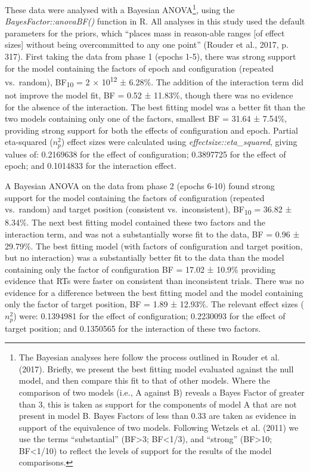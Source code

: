 \documentclass[
  man,
  floatsintext,
  longtable,
  nolmodern,
  notxfonts,
  notimes,
  colorlinks=true,linkcolor=blue,citecolor=blue,urlcolor=blue]{apa7}
\begin{document}
These data were analysed with a Bayesian ANOVA\footnote{The Bayesian
  analyses here follow the process outlined in Rouder et al. (2017).
  Briefly, we present the best fitting model evaluated against the null
  model, and then compare this fit to that of other models. Where the
  comparison of two models (i.e., A against B) reveals a Bayes Factor of
  greater than 3, this is taken as support for the components of model A
  that are not present in model B. Bayes Factors of less than 0.33 are
  taken as evidence in support of the equivalence of two models.
  Following Wetzels et al. (2011) we use the terms ``substantial''
  (BF\textgreater3; BF\textless1/3), and ``strong'' (BF\textgreater10;
  BF\textless1/10) to reflect the levels of support for the results of
  the model comparisons.}, using the \emph{BayesFactor::anovaBF()}
function in R. All analyses in this study used the default parameters
for the priors, which ``places mass in reason-able ranges {[}of effect
sizes{]} without being overcommitted to any one point'' (Rouder et al.,
2017, p. 317). First taking the data from phase 1 (epochs 1-5), there
was strong support for the model containing the factors of epoch and
configuration (repeated vs.~random), BF\textsubscript{10} = 2 ×
10\textsuperscript{12} ± 6.28\%. The addition of the interaction term
did not improve the model fit, BF = 0.52 ± 11.83\%, though there was no
evidence for the absence of the interaction. The best fitting model was
a better fit than the two models containing only one of the factors,
smallest BF = 31.64 ± 7.54\%, providing strong support for both the
effects of configuration and epoch. Partial eta-squared (\(n^2_p\))
effect sizes were calculated using \emph{effectsize::eta\_squared},
giving values of: 0.2169638 for the effect of configuration; 0.3897725
for the effect of epoch; and 0.1014833 for the interaction effect.

A Bayesian ANOVA on the data from phase 2 (epochs 6-10) found strong
support for the model containing the factors of configuration (repeated
vs.~random) and target position (consistent vs.~inconsistent),
BF\textsubscript{10} = 36.82 ± 8.34\%. The next best fitting model
contained these two factors and the interaction term, and was not a
substantially worse fit to the data, BF = 0.96 ± 29.79\%. The best
fitting model (with factors of configuration and target position, but no
interaction) was a substantially better fit to the data than the model
containing only the factor of configuration BF = 17.02 ± 10.9\%
providing evidence that RTs were faster on consistent than inconsistent
trials. There was no evidence for a difference between the best fitting
model and the model containing only the factor of target position, BF =
1.89 ± 12.93\%. The relevant effect sizes (\(n^2_p\)) were: 0.1394981
for the effect of configuration; 0.2230093 for the effect of target
position; and 0.1350565 for the interaction of these two factors.
\end{document}

